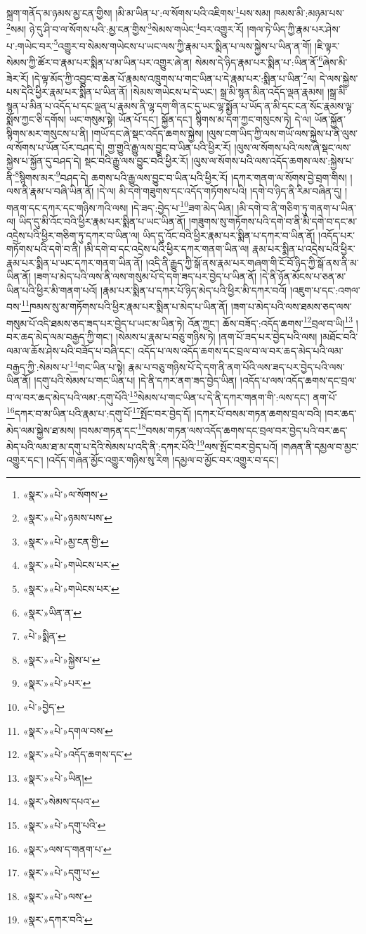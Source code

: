 སྐྲག་གནོད་མ་ཉམས་མྱ་ངན་གྱིས། །མི་མ་ཡིན་པ་:ལ་སོགས་པའི་འཇིགས་\footnote{«སྣར་»«པེ་»ལ་སོགས་}པས་སམ། ཁམས་མི་:མཉམ་པས་\footnote{«སྣར་»«པེ་»ཉམས་པས་}སམ། ཉེ་དུ་ཤི་བ་ལ་སོགས་པའི་:མྱ་ངན་གྱིས་\footnote{«སྣར་»«པེ་»མྱ་ངན་གྱི་}སེམས་གཡེང་\footnote{«སྣར་»«པེ་»གཡེངས་པར་}བར་འགྱུར་རོ། །གལ་ཏེ་ཡིད་ཀྱི་རྣམ་པར་ཤེས་པ་:གཡེང་བར་\footnote{«སྣར་»«པེ་»གཡེངས་པར་}འགྱུར་བ་སེམས་གཡེངས་པ་ཡང་ལས་ཀྱི་རྣམ་པར་སྨིན་པ་ལས་སྐྱེས་པ་ཡིན་ན་གོ། །ཇི་ལྟར་སེམས་ཀྱི་ཚོར་བ་རྣམ་པར་སྨིན་པ་མ་ཡིན་པར་འགྱུར་ཞེ་ན། སེམས་དེ་ཉིད་རྣམ་པར་སྨིན་པ་:ཡིན་ནོ་\footnote{«སྣར་»ཡིན་ན་}ཞེས་མི་ཟེར་རོ། །དེ་ལྟ་མོད་ཀྱི་འབྱུང་བ་ཆེན་པོ་རྣམས་འཁྲུགས་པ་གང་ཡིན་པ་དེ་རྣམ་པར་:སྨིན་པ་ཡིན་\footnote{«པེ་»སྨིན་}ལ། དེ་ལས་སྐྱེས་པས་དེའི་ཕྱིར་རྣམ་པར་སྨིན་པ་ཡིན་ནོ། །སེམས་གཡེངས་པ་དེ་ཡང་། སྒྲ་མི་སྙན་མིན་འདོད་ལྡན་རྣམས། །སྒྲ་མི་སྙན་པ་མིན་པ་འདོད་པ་དང་ལྡན་པ་རྣམས་ནི་ལྷ་དག་གི་ནང་དུ་ཡང་ལྷ་སྨྱོན་པ་ཡོད་ན་མི་དང་ངན་སོང་རྣམས་ལྟ་སྨོས་ཀྱང་ཅི་དགོས། ཡང་གསུམ་སྟེ། ཡོན་པོ་དང་། སྐྱོན་དང་། སྙིགས་མ་དག་ཀྱང་གསུངས་ཏེ། དེ་ལ། ཡོན་སྐྱོན་སྙིགས་མར་གསུངས་པ་ནི། །གཡོ་དང་ཞེ་སྡང་འདོད་ཆགས་སྐྱེས། །ལུས་ངག་ཡིད་ཀྱི་ལས་གཡོ་ལས་སྐྱེས་པ་ནི་ལུས་ལ་སོགས་པ་ཡོན་པོར་བཤད་དེ། གྱ་གྱུའི་རྒྱུ་ལས་བྱུང་བ་ཡིན་པའི་ཕྱིར་རོ། །ལུས་ལ་སོགས་པའི་ལས་ཞེ་སྡང་ལས་སྐྱེས་པ་སྐྱོན་དུ་བཤད་དེ། སྡང་བའི་རྒྱུ་ལས་བྱུང་བའི་ཕྱིར་རོ། །ལུས་ལ་སོགས་པའི་ལས་འདོད་ཆགས་ལས་:སྐྱེས་པ་ནི་\footnote{«སྣར་»«པེ་»སྐྱེས་པ་}སྙིགས་མར་\footnote{«སྣར་»«པེ་»པར་}བཤད་དེ། ཆགས་པའི་རྒྱུ་ལས་བྱུང་བ་ཡིན་པའི་ཕྱིར་རོ། །དཀར་གནག་ལ་སོགས་བྱེ་བྲག་གིས། །ལས་ནི་རྣམ་པ་བཞི་ཡིན་ནོ། །དེ་ལ། མི་དགེ་གཟུགས་དང་འདོད་གཏོགས་པའི། །དགེ་བ་ཉིད་ནི་རིམ་བཞིན་དུ། །གནག་དང་དཀར་དང་གཉིས་ཀའི་ལས། །དེ་ཟད་:བྱེད་པ་\footnote{«པེ་»བྱེད་}ཟག་མེད་ཡིན། །མི་དགེ་བ་ནི་གཅིག་ཏུ་གནག་པ་ཡིན་ལ། ཡིད་དུ་མི་འོང་བའི་ཕྱིར་རྣམ་པར་སྨིན་པ་ཡང་ཡིན་ནོ། །གཟུགས་སུ་གཏོགས་པའི་དགེ་བ་ནི་མི་དགེ་བ་དང་མ་འདྲེས་པའི་ཕྱིར་གཅིག་ཏུ་དཀར་བ་ཡིན་ལ། ཡིད་དུ་འོང་བའི་ཕྱིར་རྣམ་པར་སྨིན་པ་དཀར་བ་ཡིན་ནོ། །འདོད་པར་གཏོགས་པའི་དགེ་བ་ནི། །མི་དགེ་བ་དང་འདྲེས་པའི་ཕྱིར་དཀར་གནག་ཡིན་ལ། རྣམ་པར་སྨིན་པ་འདྲེས་པའི་ཕྱིར་རྣམ་པར་སྨིན་པ་ཡང་དཀར་གནག་ཡིན་ནོ། །འདི་ནི་རྒྱུད་ཀྱི་སྒོ་ནས་རྣམ་པར་གཞག་གི་ངོ་བོ་ཉིད་ཀྱི་སྒོ་ནས་ནི་མ་ཡིན་ནོ། །ཟག་པ་མེད་པའི་ལས་ནི་ལས་གསུམ་པོ་དེ་དག་ཟད་པར་བྱེད་པ་ཡིན་ནོ། །དེ་ནི་ཉོན་མོངས་པ་ཅན་མ་ཡིན་པའི་ཕྱིར་མི་གནག་པའོ། །རྣམ་པར་སྨིན་པ་དཀར་པོ་ཉིད་མེད་པའི་ཕྱིར་མི་དཀར་བའོ། །འཇུག་པ་དང་:འགལ་བས་\footnote{«སྣར་»«པེ་»དགལ་བས་}ཁམས་སུ་མ་གཏོགས་པའི་ཕྱིར་རྣམ་པར་སྨིན་པ་མེད་པ་ཡིན་ནོ། །ཟག་པ་མེད་པའི་ལས་ཐམས་ཅད་ལས་གསུམ་པོ་འདི་ཐམས་ཅད་ཟད་པར་བྱེད་པ་ཡང་མ་ཡིན་ཏེ། འོན་ཀྱང་། ཆོས་བཟོད་:འདོད་ཆགས་\footnote{«སྣར་»«པེ་»འདོད་ཆགས་དང་}བྲལ་བ་ཡི།\footnote{«སྣར་»«པེ་»ཡིན།} །བར་ཆད་མེད་ལམ་བརྒྱད་ཀྱི་གང་། །སེམས་པ་རྣམ་པ་བཅུ་གཉིས་ཏེ། །ནག་པོ་ཟད་པར་བྱེད་པའི་ལས། །མཐོང་བའི་ལམ་ལ་ཆོས་ཤེས་པའི་བཟོད་པ་བཞི་དང་། འདོད་པ་ལས་འདོད་ཆགས་དང་བྲལ་བ་ལ་བར་ཆད་མེད་པའི་ལམ་བརྒྱད་ཀྱི་:སེམས་པ་\footnote{«སྣར་»སེམས་དཔའ་}གང་ཡིན་པ་སྟེ། རྣམ་པ་བཅུ་གཉིས་པོ་དེ་དག་ནི་ནག་པོའི་ལས་ཟད་པར་བྱེད་པའི་ལས་ཡིན་ནོ། །དགུ་པའི་སེམས་པ་གང་ཡིན་པ། །དེ་ནི་དཀར་ནག་ཟད་བྱེད་ཡིན། །འདོད་པ་ལས་འདོད་ཆགས་དང་བྲལ་བ་ལ་བར་ཆད་མེད་པའི་ལམ་:དགུ་པོའི་\footnote{«སྣར་»«པེ་»དགུ་པའི་}སེམས་པ་གང་ཡིན་པ་དེ་ནི་དཀར་གནག་གི་:ལས་དང་། ནག་པོ་\footnote{«སྣར་»ལས་ད་གནག་པ་}དཀར་བ་མ་ཡིན་པའི་རྣམ་པ་:དགུ་པོ་\footnote{«སྣར་»«པེ་»དགུ་པ་}སྤོང་བར་བྱེད་དོ། །དཀར་པོ་བསམ་གཏན་ཆགས་བྲལ་བའི། །བར་ཆད་མེད་ལམ་སྐྱེས་ཐ་མས། །བསམ་གཏན་དང་\footnote{«སྣར་»«པེ་»ལས་}བསམ་གཏན་ལས་འདོད་ཆགས་དང་བྲལ་བར་བྱེད་པའི་བར་ཆད་མེད་པའི་ལམ་ཐ་མ་དགུ་པ་དེའི་སེམས་པ་འདི་ནི་:དཀར་པོའི་\footnote{«སྣར་»དཀར་བའི་}ལས་སྤོང་བར་བྱེད་པའོ། །གཞན་ནི་དམྱལ་བ་མྱང་འགྱུར་དང་། །འདོད་གཞན་མྱོང་འགྱུར་གཉིས་སུ་རིག །དམྱལ་བ་མྱོང་བར་འགྱུར་བ་དང་། 